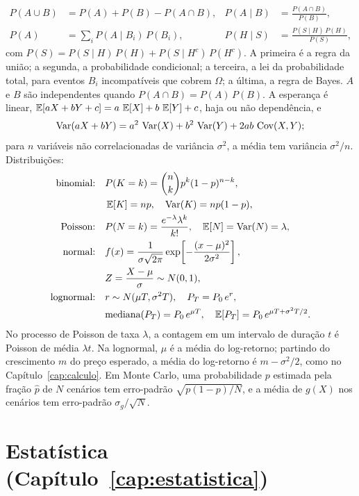 \begin{align*}
P(A \cup B) &= P(A) + P(B) - P(A \cap B) , & P(A \mid B) &= \frac{P(A \cap B)}{P(B)} , \\
P(A) &= \sum_i P(A \mid B_i)\,P(B_i) , & P(H \mid S) &= \frac{P(S \mid H)\,P(H)}{P(S)} ,
\end{align*}
com $P(S) = P(S \mid H)\,P(H) + P(S \mid H^c)\,P(H^c)$.
A primeira é a regra da união; a segunda, a probabilidade condicional; a terceira, a lei da probabilidade total, para eventos $B_i$ incompatíveis que cobrem $\Omega$; a última, a regra de Bayes. $A$ e $B$ são independentes quando $P(A \cap B) = P(A)\,P(B)$. A esperança é linear, $\operatorname{\mathbb{E}}[aX + bY + c] = a\,\operatorname{\mathbb{E}}[X] + b\,\operatorname{\mathbb{E}}[Y] + c$, haja ou não dependência, e
\begin{equation*}
\operatorname{Var}(aX + bY) = a^2\,\operatorname{Var}(X) + b^2\,\operatorname{Var}(Y) + 2ab\,\operatorname{Cov}(X, Y) ;
\end{equation*}
para $n$ variáveis não correlacionadas de variância $\sigma^2$, a média tem variância $\sigma^2/n$. Distribuições:
\begin{align*}
\text{binomial:}\quad & P(K = k) = \binom{n}{k} p^k (1-p)^{n-k} , \\
& \operatorname{\mathbb{E}}[K] = np , \quad \operatorname{Var}(K) = np(1-p) , \\
\text{Poisson:}\quad & P(N = k) = \frac{e^{-\lambda}\lambda^k}{k!} , \quad \operatorname{\mathbb{E}}[N] = \operatorname{Var}(N) = \lambda , \\
\text{normal:}\quad & f(x) = \frac{1}{\sigma\sqrt{2\pi}} \exp\!\left[-\frac{(x-\mu)^2}{2\sigma^2}\right] , \\
& Z = \frac{X - \mu}{\sigma} \sim N(0, 1) , \\
\text{lognormal:}\quad & r \sim N(\mu T, \sigma^2 T) , \quad P_T = P_0\,e^{r} , \\
& \text{mediana}(P_T) = P_0\,e^{\mu T} , \quad \operatorname{\mathbb{E}}[P_T] = P_0\,e^{\mu T + \sigma^2 T/2} .
\end{align*}
No processo de Poisson de taxa $\lambda$, a contagem em um intervalo de duração $t$ é Poisson de média $\lambda t$. Na lognormal, $\mu$ é a média do log-retorno; partindo do crescimento $m$ do preço esperado, a média do log-retorno é $m - \sigma^2/2$, como no Capítulo~\ref{cap:calculo}. Em Monte Carlo, uma probabilidade $p$ estimada pela fração $\hat p$ de $N$ cenários tem erro-padrão $\sqrt{p(1-p)/N}$, e a média de $g(X)$ nos cenários tem erro-padrão $\sigma_g/\sqrt{N}$.

\section{Estatística (Capítulo~\ref{cap:estatistica})}

